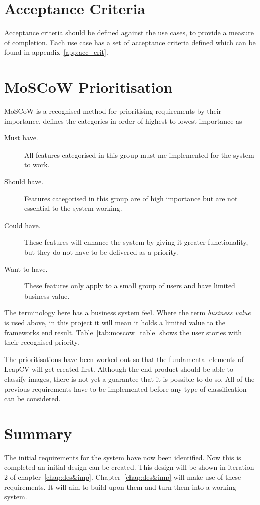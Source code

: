\documentclass[11pt,oneside]{report}
\begin{document}
		\section{Acceptance Criteria}
			Acceptance criteria should be defined against the use cases, to provide a measure of completion.
			Each use case has a set of acceptance criteria defined which can be found in appendix~\ref{app:acc_crit}.
		\section{MoSCoW Prioritisation}
			MoSCoW is a recognised method for prioritising requirements by their importance.  defines the categories in order of highest to lowest importance as
			\begin{description}
				\item[Must have. ] All features categorised in this group must me implemented for the system to work.
				\item[Should have. ] Features categorised in this group are of high importance but are not essential to the system working.
				\item[Could have. ] These features will enhance the system by giving it greater functionality, but they do not have to be delivered as a priority.
				\item[Want to have. ] These features only apply to a small group of users and have limited business value.
			\end{description}
			The terminology here has a business system feel.
			Where the term \textit{business value} is used above, in this project it will mean it holds a limited value to the frameworks end result.
			Table~\ref{tab:moscow_table} shows the user stories with their recognised priority.
			
			\clearpage
			The prioritisations have been worked out so that the fundamental elements of LeapCV will get created first.
			Although the end product should be able to classify images, there is not yet a guarantee that it is possible to do so.
			All of the previous requirements have to be implemented before any type of classification can be considered.
		\section{Summary}
			The initial requirements for the system have now been identified.
			Now this is completed an initial design can be created.
			This design will be shown in iteration 2 of chapter~\ref{chap:des&imp}.
			Chapter~\ref{chap:des&imp} will make use of these requirements.
			It will aim to build upon them and turn them into a working system.
    		
\end{document}
